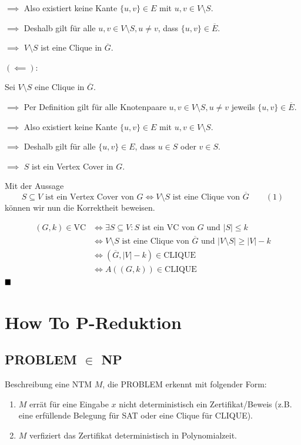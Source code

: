 \documentclass[a4paper, 11pt]{article}
\begin{document}
	
	$\implies$ Also existiert keine Kante $\{u, v\} \in E$ mit $u, v \in V\setminus S$.

	
	$\implies$ Deshalb gilt für alle $u, v \in V \setminus S, u \neq v$, dass $\{u, v\} \in \overline{E}$. 
		
	
	$\implies$ $V \setminus S$ ist eine Clique in $\overline{G}$.


	$\mathbf{(\impliedby):}$

	Sei $V\setminus S$ eine Clique in $\overline{G}$. 
	
	
	$\implies$ Per Definition gilt für alle Knotenpaare $u, v \in V\setminus S, u \neq v$ jeweils $\{u, v\} \in \overline{E}$.
		
	
	$\implies$ Also existiert keine Kante $\{u, v\} \in E$ mit $u, v \in V\setminus S$.

	
	$\implies$ Deshalb gilt für alle $\{u, v\} \in E$, dass $u \in S$ oder $v \in S$. 
		
	
	$\implies$ $S$ ist ein Vertex Cover in $G$.
	
	Mit der Aussage 
	$$S \subseteq V \text{ ist ein Vertex Cover von }G \iff V\setminus S \text{ ist eine Clique von } \overline{G} \qquad (1)$$
	können wir nun die Korrektheit beweisen.
	
	\begin{align*}
		(G, k) \in \text{VC} &\iff \exists S \subseteq V: S \text{ ist ein VC von } G \text{ und } |S| \leq k\\
		&\iff V\setminus S \text{ ist eine Clique von } \overline{G} \text{ und } |V\setminus S| \geq |V| - k\\
		&\iff (\overline{G}, |V| - k) \in \text{CLIQUE}\\
		&\iff A((G, k)) \in \text{CLIQUE}
	\end{align*}
	$\hfill\blacksquare$


\section{How To P-Reduktion}

\subsection{PROBLEM $\in $ NP}
	Beschreibung eine NTM $M$, die PROBLEM erkennt mit folgender Form:
	
	\begin{enumerate}[label=\arabic*.]
		\item $M$ errät für eine Eingabe $x$ nicht deterministisch ein Zertifikat/Beweis (z.B. eine erfüllende Belegung für SAT oder eine Clique für CLIQUE). 
		
		\item $M$ verfiziert das Zertifikat deterministisch in Polynomialzeit.
	\end{enumerate}
	
\end{document}

